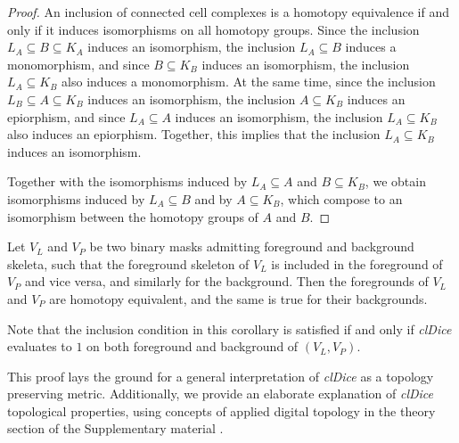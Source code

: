 \begin{proof}
	An inclusion of connected cell complexes is a homotopy equivalence if and only if it induces isomorphisms on all homotopy groups.
	Since the inclusion $L_A \subseteq B \subseteq K_A$ induces an isomorphism, the inclusion $L_A \subseteq B$ induces a monomorphism, and since $B \subseteq K_B$ induces an isomorphism, the inclusion $L_A \subseteq K_B$ also induces a monomorphism.
	At the same time, since the inclusion $L_B \subseteq A \subseteq K_B$ induces an isomorphism, the inclusion $A \subseteq K_B$ induces an epiorphism, and since $L_A \subseteq A$ induces an isomorphism, the inclusion $L_A \subseteq K_B$ also induces an epiorphism.
	Together, this implies that the inclusion $L_A \subseteq K_B$ induces an isomorphism.
	
	Together with the isomorphisms induced by $L_A \subseteq A$ and $B \subseteq K_B$, we obtain isomorphisms induced by $L_A \subseteq B$ and by $A \subseteq K_B$, which compose to an isomorphism
	between the homotopy groups of $A$ and $B$.
\end{proof}

\begin{corollary}
	Let $V_L$ and $V_P$ be two binary masks admitting foreground and background skeleta, such that the foreground skeleton of $V_L$ is included in the foreground of $V_P$ and vice versa, and similarly for the background.
	Then the foregrounds of $V_L$ and $V_P$ are homotopy equivalent, and the same is true for their backgrounds.
\end{corollary}

Note that the inclusion condition in this corollary is satisfied if and only if \textit{clDice} evaluates to $1$ on both foreground and background of $(V_L,V_P)$.

This proof lays the ground for a general interpretation of \textit{clDice} as a topology preserving metric. Additionally, we provide an elaborate explanation of \textit{clDice} topological properties, using concepts of applied digital topology in the theory section of the Supplementary material \cite{kong1989digital,kong1995topology}.